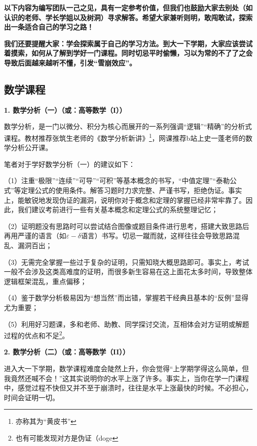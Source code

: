 \documentclass[11pt,oneside]{book}
\begin{document}
\textbf{以下内容为编写团队一己之见，具有一定参考价值，但我们也鼓励大家去别处（如认识的老师、学长学姐以及树洞）寻求解答。希望大家兼听则明，敢闯敢试，探索出一条适合自己的学习之路！}

\textbf{我们还要提醒大家：学会探索属于自己的学习方法。到大一下学期，大家应该尝试着摸索，如何从了解到学好一门课程。同时切忌平时偷懒，习以为常的不了了之会导致后面越来越听不懂，引发“雪崩效应”。}


\subsection{数学课程}
\textbf{1. 数学分析（一）（或：高等数学（I））}

数学分析，是一门以微分、积分为核心而展开的一系列强调“逻辑”“精确”的分析式课程。教材推荐张筑生老师的《数学分析新讲》\footnote{亦称其为“黄皮书”}，网课推荐b站上史一蓬老师的数学分析公开课。

\vspace{20pt}

笔者对于学好数学分析（一）的建议如下：

（1）注重“极限”“连续”“可导”“可积”等基本概念的书写，“中值定理”“泰勒公式”等定理公式的使用条件。解答习题时力求完整、严谨书写，拒绝伪证。事实上，能敏锐地发现伪证的漏洞，说明你对于概念和定理的掌握已经非常牢靠了。因此，我们建议考前进行一些有关基本概念和定理公式的系统整理记忆；

（2）证明题没有思路时可以尝试结合图像或题目条件进行思考，搭建大致思路后再用严谨的语言（如$\varepsilon-\delta$语言）书写。切忌一蹴而就，这样往往会导致思路混乱、漏洞百出；

（3）无需完全掌握一些过于复杂的证明，只需知晓大概思路即可。事实上，考试一般不会涉及这类高难度的证明，而很多新生容易在这上面花太多时间，导致整体逻辑框架混乱，重点偏移；

（4）鉴于数学分析极易因为“想当然”而出错，掌握若干经典且基本的“反例”显得尤为重要；

（5）利用好习题课，多和老师、助教、同学探讨交流，互相体会对方证明或解题过程的优点和不足\footnote{也有可能发现对方是伪证（doge}。

\vspace{20pt}

\textbf{2. 数学分析（二）（或：高等数学（II））}

进入大一下学期，数学课程难度会陡然上升，你会觉得“上学期学得这么简单，但我竟然还喊不会！”这其实说明你的水平上涨了许多。事实上，当你在学一门课程中，感觉过程不快但又并不至于崩溃时，往往是水平上涨最快的时候。不必担心，时间会证明一切。
\end{document}
